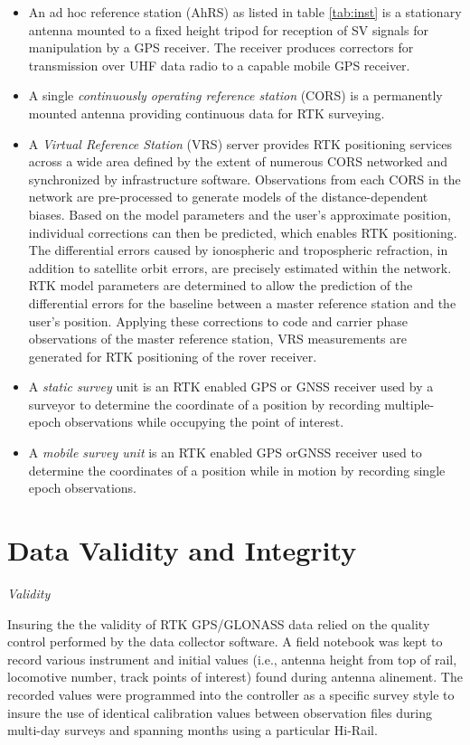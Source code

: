 \begin{itemize}
	\item An ad hoc reference station (AhRS) as listed in table \ref{tab:inst} is a stationary antenna mounted to a fixed height tripod for reception of SV signals for manipulation by a GPS receiver. The receiver produces correctors for transmission over UHF data radio to a capable mobile GPS receiver.
	\item A single \emph{continuously operating reference station} (CORS) is a permanently mounted antenna providing continuous data for RTK surveying.
	\item  A \emph{Virtual Reference Station} (VRS) server provides RTK positioning services across a wide area defined by the extent of numerous CORS networked and synchronized by infrastructure software. Observations from each CORS in the network are pre-processed to generate models of the distance-dependent biases. Based on the model parameters and the user's approximate position, individual corrections can then be predicted, which enables RTK positioning. The differential errors caused by ionospheric and tropospheric refraction, in addition to satellite orbit errors, are precisely estimated within the network. RTK model parameters are determined to allow the prediction of the differential errors for the baseline between a master reference station and the user's position. Applying these corrections to code and carrier phase observations of the master reference station, VRS measurements are generated for RTK positioning of the rover receiver.
	\item A \emph{static survey} unit is an RTK enabled GPS or GNSS receiver used by a surveyor to determine the coordinate of a position by recording multiple-epoch observations while occupying the point of interest.
	\item A \emph{mobile survey unit} is an RTK enabled GPS orGNSS receiver used to determine the coordinates of a position while in motion by recording single epoch observations.
\end{itemize}
\section{Data Validity and Integrity}

\emph{Validity}

Insuring the the validity of RTK GPS/GLONASS data relied on the quality control performed by the data collector software. A field notebook was kept to record various instrument and initial values (i.e., antenna height from top of rail, locomotive number, track points of interest) found during antenna alinement. The recorded values were programmed into the controller as a specific survey style to insure the use of identical calibration values between observation files during multi-day surveys and spanning months using a particular Hi-Rail.


